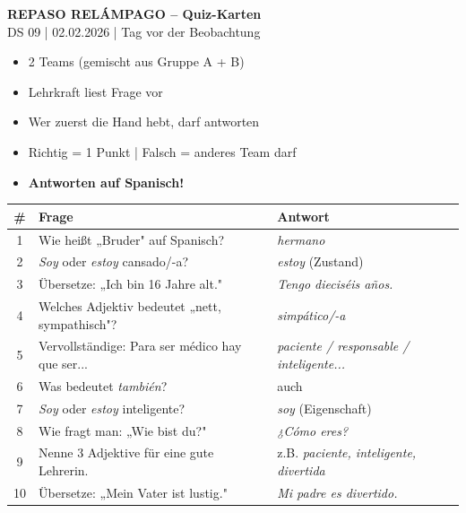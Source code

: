 \documentclass[11pt, a4paper]{article}
\begin{document}
\begin{center}
{\Large\bfseries\textcolor{spanisch}{REPASO RELÁMPAGO -- Quiz-Karten}}\\[0.3cm]
{\normalsize DS 09 | 02.02.2026 | Tag vor der Beobachtung}
\end{center}

\vspace{0.5cm}

\begin{tcolorbox}[
    colback=hellgrau,
    colframe=spanisch,
    title={\bfseries Spielregeln},
    boxrule=0.8pt
]
\begin{itemize}
    \item 2 Teams (gemischt aus Gruppe A + B)
    \item Lehrkraft liest Frage vor
    \item Wer zuerst die Hand hebt, darf antworten
    \item Richtig = 1 Punkt | Falsch = anderes Team darf
    \item \textbf{Antworten auf Spanisch!}
\end{itemize}
\end{tcolorbox}

\vspace{0.5cm}

\renewcommand{\arraystretch}{1.8}

\begin{tabularx}{\textwidth}{|c|X|X|}
\hline
\rowcolor{spanisch!20}
\textbf{\#} & \textbf{Frage} & \textbf{Antwort} \\
\hline
1 & Wie heißt „Bruder" auf Spanisch? & \textit{hermano} \\
\hline
2 & \textit{Soy} oder \textit{estoy} cansado/-a? & \textit{estoy} (Zustand) \\
\hline
3 & Übersetze: „Ich bin 16 Jahre alt." & \textit{Tengo dieciséis años.} \\
\hline
4 & Welches Adjektiv bedeutet „nett, sympathisch"? & \textit{simpático/-a} \\
\hline
5 & Vervollständige: Para ser médico hay que ser... & \textit{paciente / responsable / inteligente...} \\
\hline
6 & Was bedeutet \textit{también}? & auch \\
\hline
7 & \textit{Soy} oder \textit{estoy} inteligente? & \textit{soy} (Eigenschaft) \\
\hline
8 & Wie fragt man: „Wie bist du?" & \textit{¿Cómo eres?} \\
\hline
9 & Nenne 3 Adjektive für eine gute Lehrerin. & z.B. \textit{paciente, inteligente, divertida} \\
\hline
10 & Übersetze: „Mein Vater ist lustig." & \textit{Mi padre es divertido.} \\
\hline
\end{tabularx}
\end{document}
